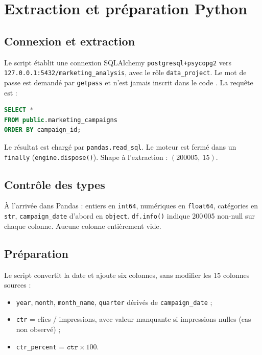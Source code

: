 \chapter{Extraction et préparation Python}
\label{chap:python}

\section{Connexion et extraction}

Le script  établit une connexion SQLAlchemy \texttt{postgresql+psycopg2} vers \texttt{127.0.0.1:5432/marketing\_analysis}, avec le rôle \texttt{data\_project}. Le mot de passe est demandé par \texttt{getpass} et n'est jamais inscrit dans le code \cite{sqlalchemydocs}. La requête est :

\begin{lstlisting}[language=SQL, caption={Extraction complète, lecture seule}, label={lst:select-star}]
SELECT *
FROM public.marketing_campaigns
ORDER BY campaign_id;
\end{lstlisting}

Le résultat est chargé par \texttt{pandas.read\_sql}. Le moteur est fermé dans un \texttt{finally} (\texttt{engine.dispose()}). Shape à l'extraction : $(200005,\ 15)$.

\section{Contrôle des types}

À l'arrivée dans Pandas : entiers en \texttt{int64}, numériques en \texttt{float64}, catégories en \texttt{str}, \texttt{campaign\_date} d'abord en \texttt{object}. \texttt{df.info()} indique 200\,005 non-null sur chaque colonne. Aucune colonne entièrement vide.

\section{Préparation}

Le script  convertit la date et ajoute six colonnes, sans modifier les 15 colonnes sources :

\begin{itemize}
\item \texttt{year}, \texttt{month}, \texttt{month\_name}, \texttt{quarter} dérivés de \texttt{campaign\_date} ;
\item \texttt{ctr} = clics / impressions, avec valeur manquante si impressions nulles (cas non observé) ;
\item \texttt{ctr\_percent} = $\texttt{ctr} \times 100$.
\end{itemize}

